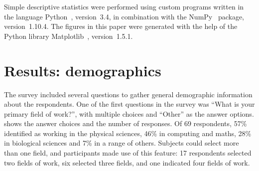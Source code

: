 \documentclass{casicswhitepaper}
\newcommand{\totalRespondents}{69\xspace}
\begin{document}
Simple descriptive statistics were performed using custom programs written in the language Python~\cite{vanRossum1991interactively, perez2011python}, version~3.4, in combination with the NumPy~\cite{vanderwalt2011numpy} package, version~1.10.4.  The figures in this paper were generated with the help of the Python library Matplotlib~\cite{hunter2007matplotlib}, version~1.5.1.


\clearpage

\section{Results: demographics}
\label{demographics}

%
%
%
%
%

The survey included several questions to gather general demographic information about the respondents.  One of the first questions in the survey was ``What is your primary field of work?'', with multiple choices and ``Other'' as the answer options.   shows the answer choices and the number of responses.  Of \totalRespondents respondents, 57\% identified as working in the physical sciences, 46\% in computing and maths, 28\% in biological sciences and 7\% in a range of others.  Subjects could select more than one field, and participants made use of this feature: 17 respondents selected two fields of work, six selected three fields, and one indicated four fields of work.
\end{document}

